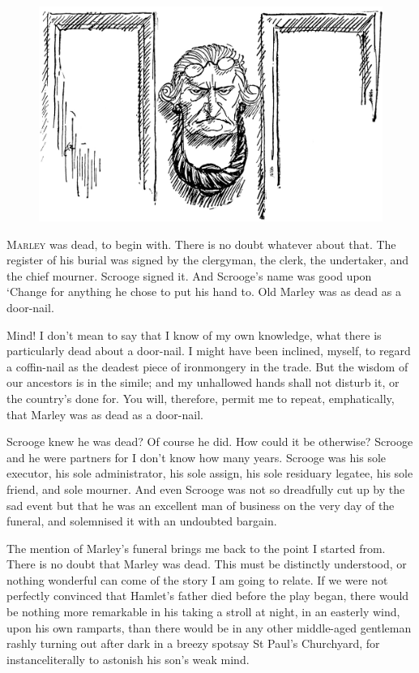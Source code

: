 \documentclass[paper=5.5in:8.5in,BCOR=7mm,twoside,DIV=calc,12pt,usegeometry]{scrbook} %
\begin{document}
\renewcommand*{\chaptermarkformat}{}
\begin{figure}[h]
\centering
\includegraphics[width=0.9\linewidth]{marleyknocker}
\end{figure}
\lettrine[loversize=.85]{M}{arley} was dead, to begin with. There is no doubt what\-ev\-er about that. The register of his burial was signed by the clergyman, the clerk, the undertaker, and the chief mourner. Scrooge signed it. And Scrooge's name was good upon `Change for anything he chose to put his hand to. Old Marley was as dead as a door-nail.

Mind! I don't mean to say that I know of my own knowledge, what there is particularly dead about a door-nail. I might have been inclined, myself, to regard a coffin-nail as the deadest piece of ironmongery in the trade. But the wisdom of our ancestors is in the simile; and my unhallowed hands shall not disturb it, or the country's done for. You will, therefore, permit me to repeat, emphatically, that Marley was as dead as a door-nail.

Scrooge knew he was dead? Of course he did. How could it be otherwise? Scrooge and he were partners for I don't know how many years. Scrooge was his sole executor, his sole administrator, his sole assign, his sole residuary legatee, his sole friend, and sole mourner. And even Scrooge was not so dreadfully cut up by the sad event but that he was an excellent man of business on the very day of the funeral, and solemnised it with an undoubted bargain.

The mention of Marley's funeral brings me back to the point I started from. There is no doubt that Marley was dead. This must be distinctly understood, or nothing wonderful can come of the story I am going to relate. If we were not perfectly convinced that Hamlet's father died before the play began, there would be nothing more remarkable in his taking a stroll at night, in an easterly wind, upon his own ramparts, than there would be in any other middle-aged gentleman rashly turning out after dark in a breezy spot\textemdash say St Paul's Churchyard, for instance\textemdash literally to astonish his son's weak mind.
\end{document}
